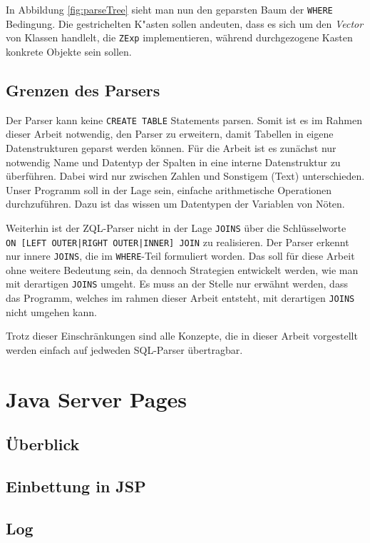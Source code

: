In Abbildung \ref{fig:parseTree} sieht man nun den geparsten Baum der \verb|WHERE| Bedingung. Die gestrichelten K"asten sollen andeuten, dass es sich um den \textit{Vector} von Klassen handlelt, die \verb|ZExp| implementieren, während durchgezogene Kasten konkrete Objekte sein sollen.

\subsection{Grenzen des Parsers}

Der Parser kann keine \verb|CREATE TABLE| Statements parsen. Somit ist es im Rahmen dieser Arbeit notwendig, den Parser zu erweitern, damit Tabellen in eigene Datenstrukturen geparst werden können. Für die Arbeit ist es zunächst nur notwendig Name und Datentyp der Spalten in eine interne Datenstruktur zu überführen. Dabei wird nur zwischen Zahlen und Sonstigem (Text) unterschieden. Unser Programm soll in der Lage sein, einfache arithmetische Operationen durchzuführen. Dazu ist das wissen um Datentypen der Variablen von Nöten.

Weiterhin ist der ZQL-Parser nicht in der Lage \verb|JOINS| über die Schlüsselworte \\\verb#ON [LEFT OUTER|RIGHT OUTER|INNER] JOIN# zu realisieren. Der Parser erkennt nur innere \verb|JOINS|, die im \verb|WHERE|-Teil formuliert worden. Das soll für diese Arbeit ohne weitere Bedeutung sein, da dennoch Strategien entwickelt werden, wie man mit derartigen \verb|JOINS| umgeht. Es muss an der Stelle nur erwähnt werden, dass das Programm, welches im rahmen dieser Arbeit entsteht, mit derartigen \verb|JOINS| nicht umgehen kann.

Trotz dieser Einschränkungen sind alle Konzepte, die in dieser Arbeit vorgestellt werden einfach auf jedweden SQL-Parser übertragbar.


\section{Java Server Pages}

\subsection{Überblick}

\subsection{Einbettung in JSP}

\subsection{Log}